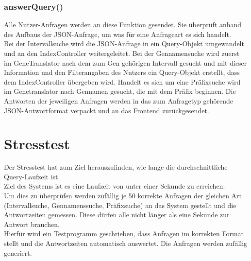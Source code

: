 \documentclass[]{article}
\begin{document}
\subsubsection{answerQuery()}
Alle Nutzer-Anfragen werden an diese Funktion gesendet. Sie überprüft anhand des Aufbaus der JSON-Anfrage, um was für eine Anfrageart es sich handelt.\\ Bei der Intervallsuche wird die JSON-Anfrage in ein Query-Objekt umgewandelt und an den IndexController weitergeleitet. Bei der Gennamensuche wird zuerst im GeneTranslator nach dem zum Gen gehörigen Intervall gesucht und mit dieser Information und den Filterangaben des Nutzers ein Query-Objekt erstellt, dass dem IndexController übergeben wird. Handelt es sich um eine Präfixsuche wird im Genetranslator nach Gennamen gesucht, die mit dem Präfix beginnen. Die Antworten der jeweiligen Anfragen werden in das zum Anfragetyp gehörende JSON-Antwortformat verpackt und an das Frontend zurückgesendet.\\

\newpage
\section{Stresstest}
Der Stresstest hat zum Ziel herauszufinden, wie lange die durchschnittliche Query-Laufzeit ist.\\
Ziel des Systems ist es eine Laufzeit von unter einer Sekunde zu erreichen.\\
Um dies zu überprüfen werden zufällig je 50 korrekte Anfragen der gleichen Art (Intervallsuche, Gennamenssuche, Präfixsuche) an das System gestellt und die Antwortzeiten gemessen. Diese dürfen alle nicht länger als eine Sekunde zur Antwort brauchen.\\
Hierfür wird ein Testprogramm geschrieben, dass Anfragen im korrekten Format stellt und die Antwortzeiten automatisch auswertet. Die Anfragen werden zufällig generiert.
\end{document}
